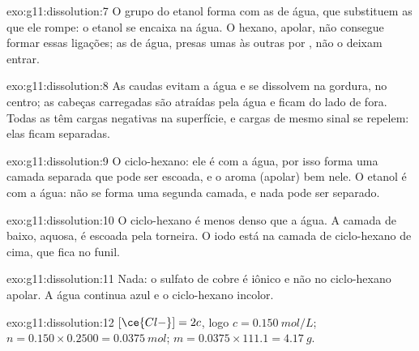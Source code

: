 \begin{solution}{exo:g11:dissolution:7}
O grupo  do etanol forma  com as 
de água, que substituem as que ele rompe: o etanol se encaixa na água. O
hexano, apolar, não consegue formar essas ligações; as  de
água, presas umas às outras por , não o deixam
entrar.
\end{solution}

\begin{solution}{exo:g11:dissolution:8}
As caudas  evitam a água e se dissolvem na gordura, no
centro; as cabeças carregadas são atraídas pela água e ficam do lado de
fora. Todas as  têm cargas negativas na superfície, e cargas de
mesmo sinal se repelem: elas ficam separadas.
\end{solution}

\begin{solution}{exo:g11:dissolution:9}
O ciclo-hexano: ele é  com a água, por isso forma uma camada
separada que pode ser escoada, e o aroma (apolar)  bem nele.
O etanol é  com a água: não se forma uma segunda camada, e nada
pode ser separado.
\end{solution}

\begin{solution}{exo:g11:dissolution:10}
O ciclo-hexano é menos denso que a água. A camada de baixo, aquosa, é
escoada pela torneira. O iodo está na camada de ciclo-hexano de cima,
que fica no funil.
\end{solution}

\begin{solution}{exo:g11:dissolution:11}
Nada: o sulfato de cobre é iônico e não  no ciclo-hexano
apolar. A água continua azul e o ciclo-hexano incolor.
\end{solution}

\begin{solution}{exo:g11:dissolution:12}
$[\ce{Cl-}] = 2c$, logo $c = \qty{0.150}{mol/L}$;
$n = 0.150 \times 0.2500 = \qty{0.0375}{mol}$;
$m = 0.0375 \times 111.1 = \qty{4.17}{g}$.
\end{solution}

